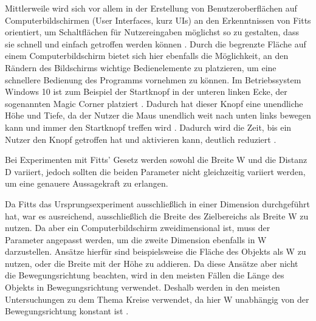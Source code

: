 Mittlerweile wird sich vor allem in der Erstellung von Benutzeroberflächen auf Computerbildschirmen (User Interfaces, kurz UIs) an den Erkenntnissen von Fitts  orientiert, um Schaltflächen für Nutzereingaben möglichst so zu gestalten, dass sie schnell und einfach getroffen werden können \cite{Kexugit.2006}. Durch die begrenzte Fläche auf einem Computerbildschirm bietet sich hier ebenfalls die Möglichkeit, an den Rändern des Bildschirms wichtige Bedienelemente zu platzieren, um eine schnellere Bedienung des Programms vornehmen zu können. Im Betriebssystem Windows 10 ist zum Beispiel der Startknopf in der unteren linken Ecke, der sogenannten \glqq Magic Corner \grqq{} platziert \cite{Kexugit.2006}. Dadurch hat dieser Knopf eine \glqq unendliche\grqq{} Höhe und Tiefe, da der Nutzer die Maus unendlich weit nach unten links bewegen kann und immer den Startknopf treffen wird \cite{Kexugit.2006}. Dadurch wird die Zeit, bis ein Nutzer den Knopf getroffen hat und aktivieren kann, deutlich reduziert \cite{Soukoreff.2004}.

Bei Experimenten mit Fitts' Gesetz werden sowohl die Breite W und die Distanz D variiert, jedoch sollten die beiden Parameter nicht gleichzeitig variiert werden, um eine genauere Aussagekraft zu erlangen. 

Da Fitts das Ursprungsexperiment ausschließlich in einer Dimension durchgeführt hat, war es ausreichend, ausschließlich die Breite des Zielbereichs als Breite W zu nutzen. Da aber ein Computerbildschirm zweidimensional ist, muss der Parameter angepasst werden, um die zweite Dimension ebenfalls in W darzustellen. Ansätze hierfür sind beispielsweise die Fläche des Objekts als W zu nutzen, oder die Breite mit der Höhe zu addieren. Da diese Ansätze aber nicht die Bewegungsrichtung beachten, wird in den meisten Fällen die Länge des Objekts in Bewegungsrichtung verwendet. Deshalb werden in den meisten Untersuchungen zu dem Thema Kreise verwendet, da hier W unabhängig von der Bewegungsrichtung konstant ist \cite{Soukoreff.2004}. 

